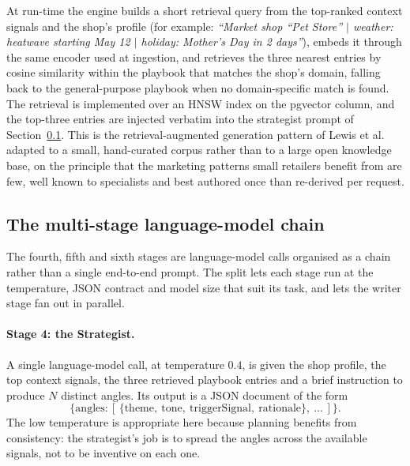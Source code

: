 At run-time the engine builds a short retrieval query from the top-ranked context signals and the shop's profile (for example: \emph{``Market shop ``Pet Store'' \(\mid\) weather: heatwave starting May 12 \(\mid\) holiday: Mother's Day in 2 days''}), embeds it through the same encoder used at ingestion, and retrieves the three nearest entries by cosine similarity within the playbook that matches the shop's domain, falling back to the general-purpose playbook when no domain-specific match is found. The retrieval is implemented over an HNSW index \cite{malkov2018hnsw} on the pgvector column, and the top-three entries are injected verbatim into the strategist prompt of Section~\ref{subsec:rec-llm-chain}. This is the retrieval-augmented generation pattern of Lewis et al.~\cite{lewis2020rag} adapted to a small, hand-curated corpus rather than to a large open knowledge base, on the principle that the marketing patterns small retailers benefit from are few, well known to specialists and best authored once than re-derived per request.

\subsection{The multi-stage language-model chain}
\label{subsec:rec-llm-chain}

The fourth, fifth and sixth stages are language-model calls organised as a chain rather than a single end-to-end prompt. The split lets each stage run at the temperature, JSON contract and model size that suit its task, and lets the writer stage fan out in parallel.

\paragraph{Stage 4: the Strategist.}
A single language-model call, at temperature $0.4$, is given the shop profile, the top context signals, the three retrieved playbook entries and a brief instruction to produce $N$ distinct angles. Its output is a JSON document of the form
\[
\{\text{angles}: [\,\{\text{theme},\ \text{tone},\ \text{triggerSignal},\ \text{rationale}\},\ \dots\,]\}.
\]
The low temperature is appropriate here because planning benefits from consistency: the strategist's job is to spread the angles across the available signals, not to be inventive on each one.

